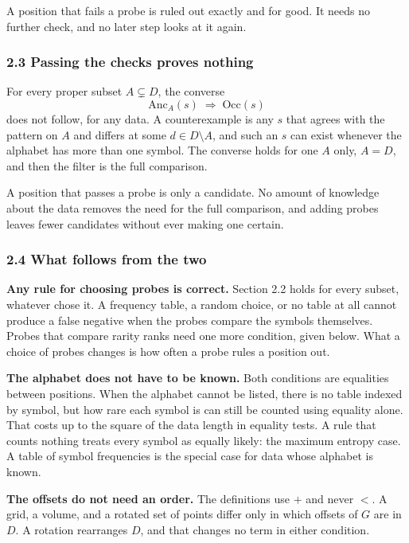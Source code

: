 A position that fails a probe is ruled out exactly and for good. It needs no further check, and no later step looks at it again.

\subsubsection{2.3 Passing the checks proves nothing}

For every proper subset \(A \subsetneq D\), the converse
\[
  \mathrm{Anc}_A(s) \;\Longrightarrow\; \mathrm{Occ}(s)
\]
does not follow, for any data. A counterexample is any \(s\) that agrees with the pattern on \(A\) and differs at some \(d \in D \setminus A\), and such an \(s\) can exist whenever the alphabet has more than one symbol. The converse holds for one \(A\) only, \(A = D\), and then the filter is the full comparison.

A position that passes a probe is only a candidate. No amount of knowledge about the data removes the need for the full comparison, and adding probes leaves fewer candidates without ever making one certain.

\subsubsection{2.4 What follows from the two}

\noindent\textbf{Any rule for choosing probes is correct.} Section 2.2 holds for every subset, whatever chose it. A frequency table, a random choice, or no table at all cannot produce a false negative when the probes compare the symbols themselves. Probes that compare rarity ranks need one more condition, given below. What a choice of probes changes is how often a probe rules a position out.

\noindent\textbf{The alphabet does not have to be known.} Both conditions are equalities between positions. When the alphabet cannot be listed, there is no table indexed by symbol, but how rare each symbol is can still be counted using equality alone. That costs up to the square of the data length in equality tests. A rule that counts nothing treats every symbol as equally likely: the maximum entropy case. A table of symbol frequencies is the special case for data whose alphabet is known.

\noindent\textbf{The offsets do not need an order.} The definitions use \(+\) and never \(<\). A grid, a volume, and a rotated set of points differ only in which offsets of \(G\) are in \(D\). A rotation rearranges \(D\), and that changes no term in either condition.

